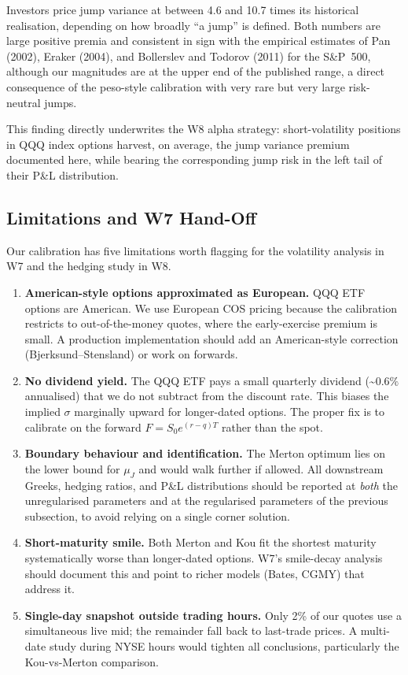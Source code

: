 Investors price jump variance at between 4.6 and 10.7 times its
historical realisation, depending on how broadly ``a jump'' is defined.
Both numbers are large positive premia and consistent in sign with the
empirical estimates of Pan (2002), Eraker (2004), and Bollerslev and
Todorov (2011) for the S\&P~500, although our magnitudes are at the
upper end of the published range, a direct consequence of the
peso-style calibration with very rare but very large risk-neutral
jumps.

This finding directly underwrites the W8 alpha strategy:
short-volatility positions in QQQ index options harvest, on average,
the jump variance premium documented here, while bearing the
corresponding jump risk in the left tail of their P\&L distribution.


\subsection*{Limitations and W7 Hand-Off}

Our calibration has five limitations worth flagging for the volatility
analysis in W7 and the hedging study in W8.

\begin{enumerate}[leftmargin=*]
   \item \textbf{American-style options approximated as European.}
   QQQ ETF options are American. We use European COS pricing because
   the calibration restricts to out-of-the-money quotes, where the
   early-exercise premium is small. A production implementation
   should add an American-style correction (Bjerksund--Stensland) or
   work on forwards.

   \item \textbf{No dividend yield.} The QQQ ETF pays a small
   quarterly dividend (\textasciitilde$0.6\%$ annualised) that we do
   not subtract from the discount rate. This biases the implied
   $\sigma$ marginally upward for longer-dated options. The proper
   fix is to calibrate on the forward $F = S_0 e^{(r-q)T}$ rather
   than the spot.

   \item \textbf{Boundary behaviour and identification.} The Merton
   optimum lies on the lower bound for $\mu_J$ and would walk further
   if allowed. All downstream Greeks, hedging ratios, and P\&L
   distributions should be reported at \emph{both} the unregularised
   parameters and at the regularised parameters of the previous
   subsection, to avoid relying on a single corner solution.

   \item \textbf{Short-maturity smile.} Both Merton and Kou fit the
   shortest maturity systematically worse than longer-dated options.
   W7's smile-decay analysis should document this and point to richer
   models (Bates, CGMY) that address it.

   \item \textbf{Single-day snapshot outside trading hours.} Only 2\%
   of our quotes use a simultaneous live mid; the remainder fall back
   to last-trade prices. A multi-date study during NYSE hours would
   tighten all conclusions, particularly the Kou-vs-Merton comparison.
\end{enumerate}

